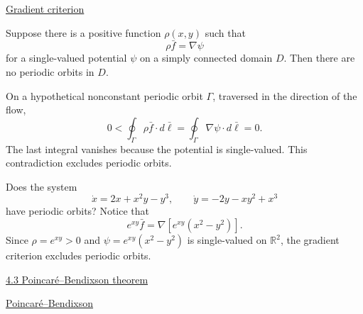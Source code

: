 \documentclass[11pt,a4paper]{article}
\begin{document}
\medskip
\noindent{}\quad\underline{Gradient criterion}

\medskip
\noindent Suppose there is a positive function $\rho(x,y)$ such that
\[
\rho\bar f=\nabla\psi
\]
for a single-valued potential $\psi$ on a simply connected domain $D$.
Then there are no periodic orbits in $D$.

\medskip
\noindent{}\quad On a hypothetical nonconstant periodic orbit
$\Gamma$, traversed in the direction of the flow,
\[
0<\oint_\Gamma\rho\bar f\cdot d\bar\ell
=\oint_\Gamma\nabla\psi\cdot d\bar\ell=0.
\]
The last integral vanishes because the potential is single-valued. This
contradiction excludes periodic orbits.

\medskip
\noindent{}\quad Does the system
\[
\dot x=2x+x^2y-y^3,\qquad
\dot y=-2y-xy^2+x^3
\]
have periodic orbits? Notice that
\[
e^{xy}\bar f=\nabla\!\left[e^{xy}(x^2-y^2)\right].
\]
Since $\rho=e^{xy}>0$ and $\psi=e^{xy}(x^2-y^2)$ is single-valued on
$\mathbb R^2$, the gradient criterion excludes periodic orbits.

\newpage
\noindent\underline{4.3 Poincar\'e--Bendixson theorem}

\medskip
\noindent{}\quad\underline{Poincar\'e--Bendixson}
\end{document}
